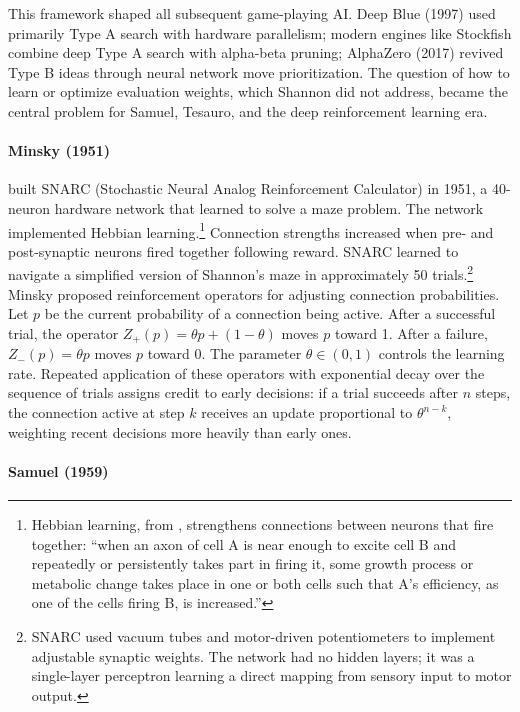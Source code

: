 This framework shaped all subsequent game-playing AI. Deep Blue (1997) used primarily Type A search with hardware parallelism; modern engines like Stockfish combine deep Type A search with alpha-beta pruning; AlphaZero (2017) revived Type B ideas through neural network move prioritization. The question of how to learn or optimize evaluation weights, which Shannon did not address, became the central problem for Samuel, Tesauro, and the deep reinforcement learning era.

\paragraph{Minsky (1951)}

\citet{Minsky1954} built SNARC (Stochastic Neural Analog Reinforcement Calculator) in 1951, a 40-neuron hardware network that learned to solve a maze problem. The network implemented Hebbian learning.\footnote{Hebbian learning, from \citet{Hebb1949}, strengthens connections between neurons that fire together: ``when an axon of cell A is near enough to excite cell B and repeatedly or persistently takes part in firing it, some growth process or metabolic change takes place in one or both cells such that A's efficiency, as one of the cells firing B, is increased.''} Connection strengths increased when pre- and post-synaptic neurons fired together following reward. SNARC learned to navigate a simplified version of Shannon's maze in approximately 50 trials.\footnote{SNARC used vacuum tubes and motor-driven potentiometers to implement adjustable synaptic weights. The network had no hidden layers; it was a single-layer perceptron learning a direct mapping from sensory input to motor output.} Minsky proposed reinforcement operators for adjusting connection probabilities. Let $p$ be the current probability of a connection being active. After a successful trial, the operator $Z_+(p) = \theta p + (1-\theta)$ moves $p$ toward 1. After a failure, $Z_-(p) = \theta p$ moves $p$ toward 0. The parameter $\theta \in (0,1)$ controls the learning rate. Repeated application of these operators with exponential decay over the sequence of trials assigns credit to early decisions: if a trial succeeds after $n$ steps, the connection active at step $k$ receives an update proportional to $\theta^{n-k}$, weighting recent decisions more heavily than early ones.

\paragraph{Samuel (1959)}


